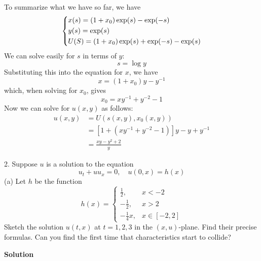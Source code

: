 \documentclass{article}
\begin{document}
%
To summarize what we have so far, we have
%
\begin{equation*}
    \begin{dcases}
        x(s) = (1 + x_0) \exp(s) - \exp(-s) \\
        y(s) = \exp(s) \\
        U(S) = (1 + x_0) \exp(s) + \exp(-s) - \exp(s)
    \end{dcases}
\end{equation*}
%
We can solve easily for $s$ in terms of $y$:
%
\begin{equation*}
    s = \log y
\end{equation*}
%
Substituting this into the equation for $x$, we have
%
\begin{equation*}
    x = (1 + x_0) y - y^{-1}
\end{equation*}
%
which, when solving for $x_0$, gives
%
\begin{equation*}
    x_0 = x y^{-1} + y^{-2} - 1
\end{equation*}
%
Now we can solve for $u(x, y)$ as follows:
%
\begin{align*}
    u(x, y) &= U(s(x, y), x_0(x, y)) \\
            &= \left[1 + \left(x y^{-1} + y^{-2} - 1\right)\right] y - y + y^{-1} \\
            &= \frac{x y - y^2 + 2}{y}
\end{align*}

\newpage

2. Suppose $u$ is a solution to the equation
%
\begin{equation*}
    u_t + u u_x = 0, \quad u(0, x) = h(x)
\end{equation*}
%
(a) Let $h$ be the function
%
\begin{equation*}
    h(x) =
        \begin{cases}
            \frac{1}{2}, & x < -2 \\
            -\frac{1}{2}, & x > 2 \\
            -\frac{1}{4} x, & x \in [-2, 2]
        \end{cases}
\end{equation*}
%
Sketch the solution $u(t, x)$ at $t = 1, 2, 3$ in the $(x, u)$-plane.
Find their precise formulas. Can you find the first time that
characteristics start to collide?

\textbf{Solution}
\end{document}
